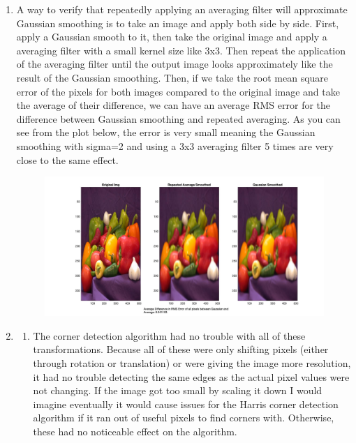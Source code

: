 \documentclass[12pt]{article}
\begin{document}
\begin{enumerate}
	\item A way to verify that repeatedly applying an averaging filter will approximate Gaussian smoothing is to take an image and apply both side by side. First, apply a Gaussian smooth to it, then take the original image and apply a averaging filter with a small kernel size like 3x3. Then repeat the application of the averaging filter until the output image looks approximately like the result of the Gaussian smoothing. Then, if we take the root mean square error of the pixels for both images compared to the original image and take the average of their difference, we can have an average RMS error for the difference between Gaussian smoothing and repeated averaging. As you can see from the plot below, the error is very small meaning the Gaussian smoothing with sigma=2 and using a 3x3 averaging filter 5 times are very close to the same effect. \\
	\begin{figure}[H]
		\includegraphics[width=1\textwidth]{Q5_results.jpg}
	\end{figure}
	
	\item
	\begin{enumerate}
		\item The corner detection algorithm had no trouble with all of these transformations. Because all of these were only shifting pixels (either through rotation or translation) or were giving the image more resolution, it had no trouble detecting the same edges as the actual pixel values were not changing. If the image got too small by scaling it down I would imagine eventually it would cause issues for the Harris corner detection algorithm if it ran out of useful pixels to find corners with. Otherwise, these had no noticeable effect on the algorithm.
		

\end{enumerate}
\end{enumerate}
\end{document}
